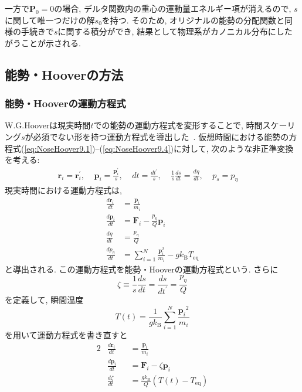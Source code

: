 一方で$\bm{P}_{0} = 0$の場合, デルタ関数内の重心の運動量エネルギー項が消えるので, $s$に関して唯一つだけの解$s_{0}$を持つ. 
そのため, オリジナルの能勢の分配関数と同様の手続きで$s$に関する積分ができ, 結果として物理系がカノニカル分布にしたがうことが示される. 

\subsection{能勢・Hooverの方法}
\subsubsection{能勢・Hooverの運動方程式}
W.G.Hooverは現実時間$t$での能勢の運動方程式を変形することで,
時間スケーリング$s$が必須でない形を持つ運動方程式を導出した~\cite{1985Hoover, 1992Martyna}.
仮想時間における能勢の方程式(\ref{eq:NoseHoover9.1})--(\ref{eq:NoseHoover9.4})に対して, 次のような非正準変換を考える:
\begin{align}
 \bm{r}_{i} = \bm{r}^{\prime}_{i},~~~~~
 \bm{p}_{i} = \frac{\bm{p}^{\prime}_{i}}{s},~~~~~
 dt         = \frac{dt^{\prime}}{s},~~~~~
 \frac{1}{s}\frac{ds}{dt} = \frac{d \eta}{dt},~~~~~
 p_{s}      = p_{\eta}~~~~~
 \label{Eq:Nose_Hoover_Transformation}
\end{align}
現実時間における運動方程式は,
\begin{align}
 \frac{d \bm{r}_{i}}{dt} &= \frac{\bm{p}_{i}}{m_{i}}
 \label{Eq:EoM_Nose_Hover_1.1}
 \\
 \frac{d \bm{p}_{i}}{dt} &= \bm{F}_{i} - \frac{p_{\eta}}{Q} \bm{p}_{i}
 \label{Eq:EoM_Nose_Hover_1.2}
 \\
 \frac{d \eta}{dt}       &= \frac{p_{\eta}}{Q}
 \label{Eq:EoM_Nose_Hover_1.3}
 \\
 \frac{d p_{\eta}}{dt}   &= \sum_{i=1}^{N}\frac{\bm{p}_{i}^{2}}{m_{i}} - g k_{\mathrm{B}} T_{\mathrm{eq}}
 \label{Eq:EoM_Nose_Hover_1.4}
\end{align}
と導出される. この運動方程式を能勢・Hooverの運動方程式という.
さらに
\begin{equation}
 \zeta \equiv \frac{1}{s} \frac{d s}{d t} = \frac{d s}{d t^{\prime}} = \frac{p_{\eta}}{Q}
 \label{eq:NoseHoover11}
\end{equation}
を定義して, 瞬間温度
\begin{equation}
 T(t) = \frac{1}{g k_{\mathrm{B}}} \sum_{i=1}^{N} \frac{{\bm{p}_{i}}^{2}}{m_{i}}
 \label{eq:NoseHoover12}
\end{equation}
を用いて運動方程式を書き直すと
\begin{alignat}{2}
 &\frac{d \bm{r}_{i}}{d t}
 &&= \frac{\bm{p}_{i}}{m_{i} }
 \label{eq:NoseHoover13.1}
 \\
 &\frac{d \bm{p}_{i}}{d t}
 &&= \bm{F}_{i} - \zeta \bm{p}_{i}
 \label{eq:NoseHoover13.2}
 \\
 &\frac{d \zeta}{d t}
 &&= \frac{g k_{\mathrm{B}}}{Q} \left( T(t) - T_{\mathrm{eq}}\right)
 \label{eq:NoseHoover13.3}
\end{alignat}
